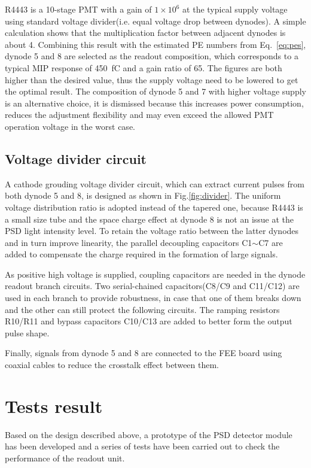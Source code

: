 \documentclass[5p, times]{elsarticle}
\begin{document}
R4443 is a 10-stage PMT with a gain of $1\times10^6$ at the typical supply voltage using standard voltage divider(i.e. equal voltage drop between dynodes).
A simple calculation shows that the multiplication factor between adjacent dynodes is about 4.
Combining this result with the estimated PE numbers from Eq.~\ref{eq:pes}, dynode 5 and 8 are selected as the readout composition, which corresponds to a typical MIP response of \SI{450}{\femto\coulomb} and a gain ratio of 65.
The figures are both higher than the desired value, thus the supply voltage need to be lowered to get the optimal result.
The composition of dynode 5 and 7 with higher voltage supply is an alternative choice, it is dismissed because this increases power consumption, reduces the adjustment flexibility and may even exceed the allowed PMT operation voltage in the worst case.

\subsection{Voltage divider circuit}
\label{sec:divider_design}
A cathode grouding voltage divider circuit, which can extract current pulses from both dynode 5 and 8, is designed as shown in Fig.\ref{fig:divider}.
The uniform voltage distribution ratio is adopted instead of the tapered one, because R4443 is a small size tube and the space charge effect at dynode 8 is not an issue at the PSD light intensity level.
To retain the voltage ratio between the latter dynodes and in turn improve linearity, the parallel decoupling capacitors C1$\sim$C7 are added to compensate the charge required in the formation of large signals.

As positive high voltage is supplied, coupling capacitors are needed in the dynode readout branch circuits.
Two serial-chained capacitors(C8/C9 and C11/C12) are used in each branch to provide robustness, in case that one of them breaks down and the other can still protect the following circuits.  
The ramping resistors R10/R11 and bypass capacitors C10/C13 are added to better form the output pulse shape.

Finally, signals from dynode 5 and 8 are connected to the FEE board using coaxial cables to reduce the crosstalk effect between them.

\section{Tests result}
\label{sec:result}
Based on the design described above, a prototype of the PSD detector module has been developed and a series of tests have been carried out to check the performance of the readout unit.
\end{document}
